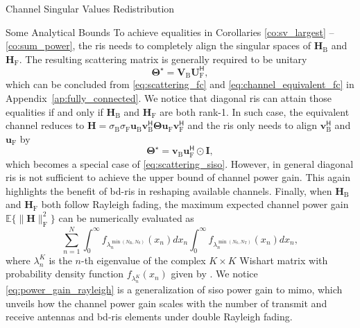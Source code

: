 \documentclass[journal]{IEEEtran}
\begin{document}
\begin{section}{Channel Singular Values Redistribution}
\begin{subsection}{Some Analytical Bounds}
		To achieve equalities in Corollaries \ref{co:sv_largest} -- \ref{co:sum_power}, the \gls{ris} needs to completely align the singular spaces of $\mathbf{H}_\mathrm{B}$ and $\mathbf{H}_\mathrm{F}$.
		The resulting scattering matrix is generally required to be unitary
		\begin{equation}
			\mathbf{\Theta}^\star = \mathbf{V}_\mathrm{B} \mathbf{U}_\mathrm{F}^\mathsf{H},
			\label{eq:scattering_fc_optimal}
		\end{equation}
		which can be concluded from \eqref{eq:scattering_fc} and \eqref{eq:channel_equivalent_fc} in Appendix~\ref{ap:fully_connected}.
		We notice that diagonal \gls{ris} can attain those equalities if and only if $\mathbf{H}_\mathrm{B}$ and $\mathbf{H}_\mathrm{F}$ are both rank-1.
		In such case, the equivalent channel reduces to $\mathbf{H} = \sigma_\mathrm{B} \sigma_\mathrm{F} \mathbf{u}_\mathrm{B} \mathbf{v}_\mathrm{B}^\mathsf{H} \mathbf{\Theta} \mathbf{u}_\mathrm{F} \mathbf{v}_\mathrm{F}^\mathsf{H}$ and the \gls{ris} only needs to align $\mathbf{v}_\mathrm{B}^\mathsf{H}$ and $\mathbf{u}_\mathrm{F}$ by
		\begin{equation}
			\mathbf{\Theta}^\star = \mathbf{v}_\mathrm{B} \mathbf{u}_\mathrm{F}^\mathsf{H} \odot \mathbf{I},
		\end{equation}
		which becomes a special case of \eqref{eq:scattering_siso}.
		However, in general diagonal \gls{ris} is not sufficient to achieve the upper bound of channel power gain.
		This again highlights the benefit of \gls{bd}-\gls{ris} in reshaping available channels.
		Finally, when $\mathbf{H}_\mathrm{B}$ and $\mathbf{H}_\mathrm{F}$ both follow Rayleigh fading, the maximum expected channel power gain $\mathbb{E}\bigl\{ \lVert \mathbf{H} \rVert _ \mathrm{F}^2 \bigr\}$ can be numerically evaluated as
		\begin{equation}
			\sum_{n=1}^N \int_0^\infty f_{\lambda_n^{\min(N_\mathrm{R},N_\mathrm{S})}}(x_n) d x_n \int_0^\infty f_{\lambda_n^{\min(N_\mathrm{S},N_\mathrm{T})}}(x_n) d x_n,
			\label{eq:power_gain_rayleigh}
		\end{equation}
		where $\lambda_n^{K}$ is the $n$-th eigenvalue of the complex $K \times K$ Wishart matrix with probability density function $f_{\lambda_n^{K}}(x_n)$ given by \cite[Equation 51]{Zanella2009}.
		We notice \eqref{eq:power_gain_rayleigh} is a generalization of \gls{siso} power gain \cite[Equation 58]{Shen2020a} to \gls{mimo}, which unveils how the channel power gain scales with the number of transmit and receive antennas and \gls{bd}-\gls{ris} elements under double Rayleigh fading.


\end{subsection}
\end{section}
\end{document}
